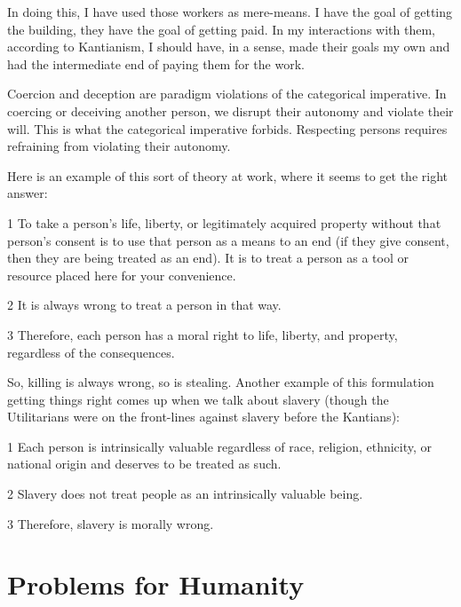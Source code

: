 In doing this, I have used those workers as mere-means. I have the goal of getting the building, they have the goal of getting paid. In my interactions with them, according to Kantianism, I should have, in a sense, made their goals my own and had the intermediate end of paying them for the work. 

Coercion and deception are paradigm violations of the categorical imperative. In coercing or deceiving another person, we disrupt their autonomy and violate their will. This is what the categorical imperative forbids. Respecting persons requires refraining from violating their autonomy.

Here is an example of this sort of theory at work, where it seems to get the right answer:
\begin{earg}
    \item[1] To take a person’s life, liberty, or legitimately acquired property without that person’s consent is to use that person as a means to an end (if they give consent, then they are being treated as an end). It is to treat a person as a tool or resource placed here for your convenience.
    \item[2] It is always wrong to treat a person in that way.
    \item[3] Therefore, each person has a moral right to life, liberty, and property, regardless of the consequences.
\end{earg}
So, killing is always wrong, so is stealing. Another example of this formulation getting things right comes up when we talk about slavery (though the Utilitarians were on the front-lines against slavery before the Kantians):
\begin{earg}
    \item[1] Each person is intrinsically valuable regardless of race, religion, ethnicity, or national origin and deserves to be treated as such.
    \item[2] Slavery does not treat people as an intrinsically valuable being.
    \item[3] Therefore, slavery is morally wrong.
\end{earg}
\section{Problems for Humanity}

